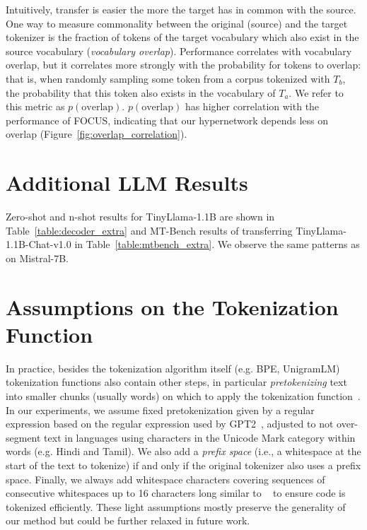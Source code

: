 \documentclass{article}
\begin{document}
Intuitively, transfer is easier the more the target has in common with the source. One way to measure commonality between the original (source) and the target tokenizer is the fraction of tokens of the target vocabulary which also exist in the source vocabulary (\textit{vocabulary overlap}). Performance correlates with vocabulary overlap, but it correlates more strongly with the probability for tokens to overlap: that is, when randomly sampling some token from a corpus tokenized with $T_b$, the probability that this token also exists in the vocabulary of $T_a$. We refer to this metric as \textit{$p(\text{overlap})$}. \textit{$p(\text{overlap})$} has higher correlation with the performance of FOCUS, indicating that our hypernetwork depends less on overlap (Figure~\ref{fig:overlap_correlation}).





\section{Additional LLM Results}
\label{appendix:extra_llms}

Zero-shot and n-shot results for TinyLlama-1.1B are shown in Table~\ref{table:decoder_extra} and MT-Bench results of transferring TinyLlama-1.1B-Chat-v1.0 in Table~\ref{table:mtbench_extra}. We observe the same patterns as on Mistral-7B.

\section{Assumptions on the Tokenization Function}
\label{appendix:tokenizer_assumptions}

In practice, besides the tokenization algorithm itself (e.g. BPE, UnigramLM) tokenization functions also contain other steps, in particular \textit{pretokenizing} text into smaller chunks (usually words) on which to apply the tokenization function~\citep{mielke2021words}. In our experiments, we assume fixed pretokenization given by a regular expression based on the regular expression used by GPT2~\citep{radford2019language}, adjusted to not over-segment text in languages using characters in the Unicode Mark category within words (e.g. Hindi and Tamil). We also add a \textit{prefix space} (i.e., a whitespace at the start of the text to tokenize) if and only if the original tokenizer also uses a prefix space. Finally, we always add whitespace characters covering sequences of consecutive whitespaces up to 16 characters long similar to ~\citet{black-etal-2022-gpt} to ensure code is tokenized efficiently. These light assumptions mostly preserve the generality of our method but could be further relaxed in future work.
\end{document}
